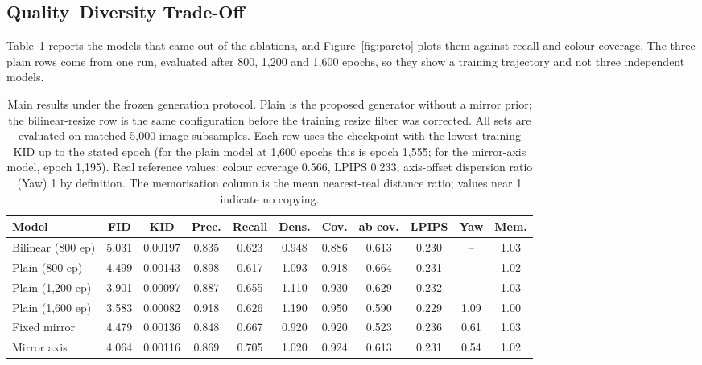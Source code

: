\documentclass[electronics,article,submit,pdftex,moreauthors]{Definitions/mdpi}
\begin{document}
\subsection{Quality--Diversity Trade-Off}
\label{subsec:pareto}

Table~\ref{tab:main} reports the models that came out of the ablations, and
Figure~\ref{fig:pareto} plots them against recall and colour coverage. The
three plain rows come from one run, evaluated after 800, 1,200 and 1,600
epochs, so they show a training trajectory and not three independent models.

\begin{table}[H]
\caption{Main results under the frozen generation protocol. Plain is the proposed generator without a mirror prior; the bilinear-resize row is the same configuration before the training resize filter was corrected. All sets are evaluated on
matched 5,000-image subsamples. Each row uses the checkpoint with the lowest
training KID up to the stated epoch (for the plain model at 1,600 epochs this is
epoch 1,555; for the mirror-axis model, epoch 1,195). Real reference values: colour coverage 0.566,
LPIPS 0.233, axis-offset dispersion ratio (Yaw) 1 by definition. The memorisation column
is the mean nearest-real distance ratio; values near 1 indicate no
copying.}
\label{tab:main}
\small
\setlength{\tabcolsep}{3.5pt}
\begin{tabular}{lcccccccccc}
\toprule
\textbf{Model} & \textbf{FID} & \textbf{KID} & \textbf{Prec.} &
\textbf{Recall} & \textbf{Dens.} & \textbf{Cov.} & \textbf{ab cov.} &
\textbf{LPIPS} & \textbf{Yaw} & \textbf{Mem.} \\
\midrule
Bilinear (800 ep) & 5.031 & 0.00197 & 0.835 & 0.623 & 0.948 & 0.886 & 0.613 & 0.230 & --   & 1.03 \\
Plain (800 ep) & 4.499 & 0.00143 & 0.898 & 0.617 & 1.093 & 0.918 & 0.664 & 0.231 & --   & 1.02 \\
Plain (1,200 ep) & 3.901 & 0.00097 & 0.887 & 0.655 & 1.110 & 0.930 & 0.629 & 0.232 & --   & 1.03 \\
Plain (1,600 ep) & 3.583 & 0.00082 & 0.918 & 0.626 & 1.190 & 0.950 & 0.590 & 0.229 & 1.09 & 1.00 \\
Fixed mirror & 4.479 & 0.00136 & 0.848 & 0.667 & 0.920 & 0.920 & 0.523 & 0.236 & 0.61 & 1.03 \\
Mirror axis & 4.064 & 0.00116 & 0.869 & 0.705 & 1.020 & 0.924 & 0.613 & 0.231 & 0.54 & 1.02 \\
\bottomrule
\end{tabular}
\end{table}
\end{document}
